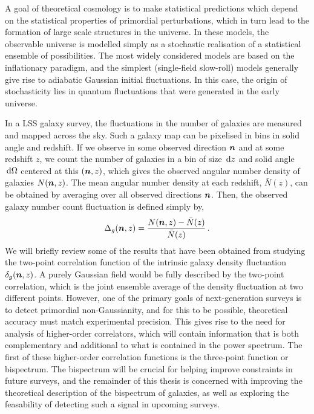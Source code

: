 A goal of theoretical cosmology is to make statistical predictions which depend on the statistical properties of primordial perturbations, which in turn lead to the formation of large scale structures in the universe. In these models, the observable universe is modelled simply as a stochastic realisation of a statistical ensemble of possibilities. The most widely considered models are based on the inflationary paradigm, and the simplest (single-field slow-roll) models generally give rise to adiabatic Gaussian initial fluctuations. In this case, the origin of stochasticity lies in quantum fluctuations that were generated in the early universe. 

In a LSS galaxy survey, the fluctuations in the number of galaxies are measured and mapped across the sky. Such a galaxy map can be pixelised in bins in solid angle and redshift. If we observe in some observed direction $\bm {n}$ and at some redshift $z$, we count the number of galaxies in a bin of size $\,\mathrm{d} z$ and solid angle $\,\mathrm{d}\Omega$ centered at this $(\bm {n},z)$, which gives the observed angular number density of galaxies $N(\bm {n},z)$. The mean angular number density at each redshift, $\bar{N}(z)$, can be obtained by averaging over all observed directions $\bm {n}$. 
 Then, the observed galaxy number count fluctuation is defined simply by, 
\begin{equation}
	\Delta_g(\bm {n},z) = \frac{N(\bm {n},z) - \bar{N}(z)}{\bar{N}(z)}\,.
\end{equation}
We will briefly review some of the results that have been obtained from studying the two-point correlation function of the intrinsic galaxy density fluctuation $\delta_g(\bm {n},z)$. A purely Gaussian field would be fully described by the two-point correlation, which is the joint ensemble average of the density fluctuation at two different points. However, one of the primary goals of next-generation surveys is to detect primordial non-Gaussianity, and for this to be possible, theoretical accuracy must match experimental precision. This gives rise to the need for analysis of higher-order correlators, which will contain information that is both complementary and additional to what is contained in the power spectrum. The first of these higher-order correlation functions is the three-point function or bispectrum. The bispectrum will be crucial for helping improve constraints in future surveys, and the remainder of this thesis is concerned with improving the theoretical description of the bispectrum of galaxies, as well as exploring the feasability of detecting such a signal in upcoming surveys.

